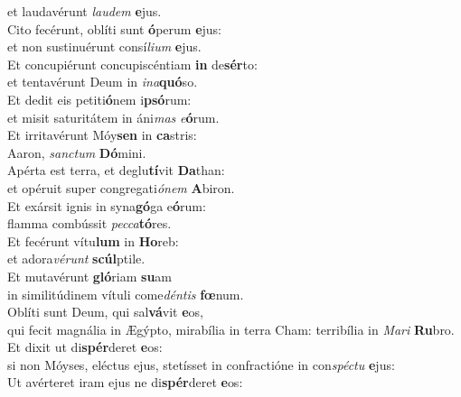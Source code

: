 \oddverse et laudavérunt \textit{lau}\textit{dem} \textbf{e}jus.\\
\evenverse Cito fecérunt, oblíti sunt \textbf{ó}perum \textbf{e}jus:~\*\\
\evenverse et non sustinuérunt consí\textit{li}\textit{um} \textbf{e}jus.\\
\oddverse Et concupiérunt concupiscéntiam \textbf{in} de\textbf{sér}to:~\*\\
\oddverse et tentavérunt Deum in \textit{i}\textit{na}\textbf{quó}so.\\
\evenverse Et dedit eis petiti\textbf{ó}nem i\textbf{psó}rum:~\*\\
\evenverse et misit saturitátem in áni\textit{mas} \textit{e}\textbf{ó}rum.\\
\oddverse Et irritavérunt Móy\textbf{sen} in \textbf{ca}stris:~\*\\
\oddverse Aaron, \textit{san}\textit{ctum} \textbf{Dó}mini.\\
\evenverse Apérta est terra, et deglu\textbf{tí}vit \textbf{Da}than:~\*\\
\evenverse et opéruit super congregati\textit{ó}\textit{nem} \textbf{A}biron.\\
\oddverse Et exársit ignis in syna\textbf{gó}ga e\textbf{ó}rum:~\*\\
\oddverse flamma combússit \textit{pec}\textit{ca}\textbf{tó}res.\\
\evenverse Et fecérunt vítu\textbf{lum} in \textbf{Ho}reb:~\*\\
\evenverse et adora\textit{vé}\textit{runt} \textbf{scúl}ptile.\\
\oddverse Et mutavérunt \textbf{gló}riam \textbf{su}am~\*\\
\oddverse in similitúdinem vítuli come\textit{dén}\textit{tis} \textbf{fœ}num.\\
\evenverse Oblíti sunt Deum, qui sal\textbf{vá}vit \textbf{e}os,~\*\\
\evenverse qui fecit magnália in Ægýpto, mirabília in terra Cham: terribília in \textit{Ma}\textit{ri} \textbf{Ru}bro.\\
\oddverse Et dixit ut di\textbf{spér}deret \textbf{e}os:~\*\\
\oddverse si non Móyses, eléctus ejus, stetísset in confractióne in con\textit{spé}\textit{ctu} \textbf{e}jus:\\
\evenverse Ut avérteret iram ejus ne di\textbf{spér}deret \textbf{e}os:~\*\\
